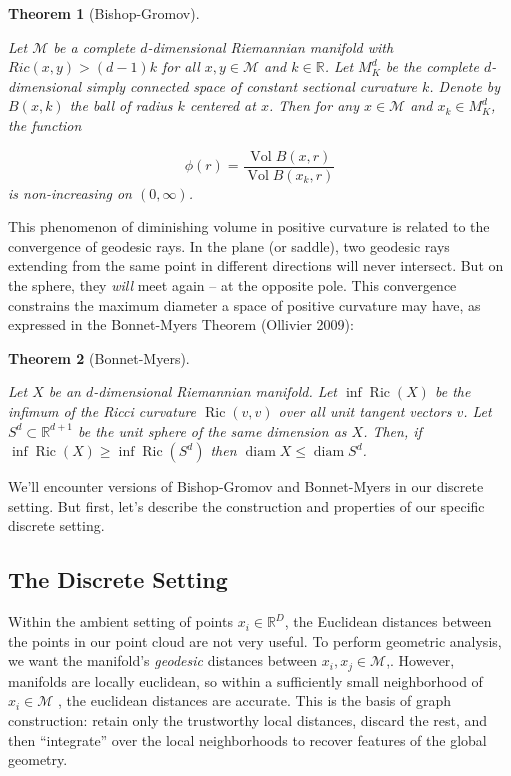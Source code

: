 \documentclass[
  letterpaper,
  DIV=11,
  numbers=noendperiod]{scrartcl}
\theoremstyle{plain}
\newtheorem{theorem}{Theorem}[section]
\theoremstyle{plain}
\theoremstyle{definition}
\theoremstyle{plain}
\theoremstyle{definition}
\theoremstyle{plain}
\theoremstyle{remark}
\begin{document}
\begin{theorem}[Bishop-Gromov]\protect\hypertarget{thm-bishop-gromov}{}\label{thm-bishop-gromov}

Let \(\mathcal{M}\) be a complete \(d\)-dimensional Riemannian manifold
with \(Ric(x,y) > (d - 1)k\) for all \(x,y \in \mathcal{M}\) and
\(k \in \mathbb{R}\). Let \(M_{K}^d\) be the complete \(d\)-dimensional
simply connected space of constant sectional curvature \(k\). Denote by
\(B(x,k)\) the ball of radius \(k\) centered at \(x\). Then for any
\(x \in \mathcal{M}\) and \(x_{k} \in M_{K}^d\), the function

\[
\phi(r) = \frac{\operatorname{Vol}B(x,r)}{\operatorname{Vol}B(x_{k},r)}
\] is non-increasing on \((0,\infty)\).

\end{theorem}

This phenomenon of diminishing volume in positive curvature is related
to the convergence of geodesic rays. In the plane (or saddle), two
geodesic rays extending from the same point in different directions will
never intersect. But on the sphere, they \emph{will} meet again -- at
the opposite pole. This convergence constrains the maximum diameter a
space of positive curvature may have, as expressed in the Bonnet-Myers
Theorem (Ollivier 2009):

\begin{theorem}[Bonnet-Myers]\protect\hypertarget{thm-bonnet-myers}{}\label{thm-bonnet-myers}

Let \(X\) be an \(d\)-dimensional Riemannian manifold. Let
\(\inf \operatorname{Ric}(X)\) be the infimum of the Ricci curvature
\(\operatorname{Ric}(v, v)\) over all unit tangent vectors \(v\). Let
\(S^d \subset \mathbb{R}^{d+1}\) be the unit sphere of the same
dimension as \(X\). Then, if
\(\inf \operatorname{Ric}(X) \geqslant \inf \operatorname{Ric}\left(S^d\right)\)
then \(\operatorname{diam} X \leqslant \operatorname{diam} S^d\).

\end{theorem}

We'll encounter versions of Bishop-Gromov and Bonnet-Myers in our
discrete setting. But first, let's describe the construction and
properties of our specific discrete setting.

\subsection{The Discrete Setting}\label{the-discrete-setting}

Within the ambient setting of points \(x_{i} \in \mathbb{R}^D\), the
Euclidean distances between the points in our point cloud are not very
useful. To perform geometric analysis, we want the manifold's
\emph{geodesic} distances between \(x_{i}, x_{j} \in \mathcal{M}\),.
However, manifolds are locally euclidean, so within a sufficiently small
neighborhood of \(x_{i} \in \mathcal{M}\) , the euclidean distances are
accurate. This is the basis of graph construction: retain only the
trustworthy local distances, discard the rest, and then ``integrate''
over the local neighborhoods to recover features of the global geometry.
\end{document}
